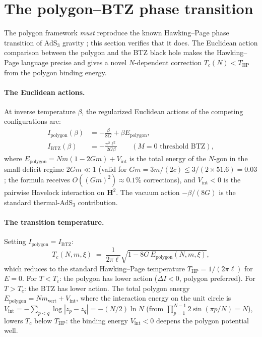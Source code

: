 \section{The polygon--BTZ phase transition}
\label{sec:btz}

The polygon framework \emph{must} reproduce the known
Hawking--Page phase transition of AdS$_3$ gravity
\citep{Witten1998AdS}; this section verifies that it does.
The Euclidean action comparison between the polygon and the
BTZ black hole makes the Hawking--Page language precise
and gives a novel $N$-dependent correction
$T_c(N) < T_{\mathrm{HP}}$ from the polygon binding energy.

\paragraph{The Euclidean actions.}
At inverse temperature $\beta$, the regularized Euclidean
actions of the competing configurations are:
\begin{align}
  I_{\mathrm{polygon}}(\beta)
    &= -\frac{\beta}{8G} + \beta E_{\mathrm{polygon}},
    \label{eq:I-polygon} \\
  I_{\mathrm{BTZ}}(\beta)
    &= -\frac{\pi^2 \ell^2}{2G\beta}
    \qquad (M = 0\text{ threshold BTZ}),
    \label{eq:I-btz}
\end{align}
where $E_{\mathrm{polygon}} = Nm(1{-}2Gm) + V_{\mathrm{int}}$
is the total energy of the $N$-gon in the small-deficit
regime $2Gm \ll 1$ (valid for
$Gm = 3m/(2c) \le 3/(2 \times 51.6) = 0.03$; the formula
receives $O((Gm)^2) \approx 0.1\%$ corrections),
and $V_{\mathrm{int}} < 0$ is the
pairwise Havelock interaction on $\mathbf{H}^2$.
The vacuum action $-\beta/(8G)$ is the standard thermal-AdS$_3$
contribution.

\paragraph{The transition temperature.}
Setting $I_{\mathrm{polygon}} = I_{\mathrm{BTZ}}$:
\begin{equation}
  \label{eq:polygon-hp}
  T_c(N,m,\xi) \;=\;
    \frac{1}{2\pi\ell}
    \sqrt{1 - 8G\,E_{\mathrm{polygon}}(N,m,\xi)},
\end{equation}
which reduces to the standard Hawking--Page temperature
$T_{\mathrm{HP}} = 1/(2\pi\ell)$ for $E = 0$.
For $T < T_c$: the polygon has lower action
($\Delta I < 0$, polygon preferred).
For $T > T_c$: the BTZ has lower action.
The total polygon energy
$E_{\mathrm{polygon}} = Nm_{\mathrm{vert}}
+ V_{\mathrm{int}}$, where the interaction energy
on the unit circle is
$V_{\mathrm{int}} = -\!\sum_{p<q}\!\log|z_p{-}z_q|
= -(N/2)\ln N$
(from $\prod_{p=1}^{N-1}2\sin(\pi p/N) = N$),
lowers $T_c$ below $T_{\mathrm{HP}}$: the binding
energy $V_{\mathrm{int}} < 0$ deepens the polygon
potential well.

